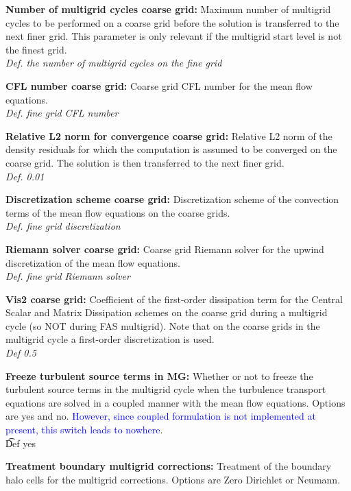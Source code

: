\documentclass[12pt,epsf,colordvi]{article}
\begin{document}
\begin{description}
% 
     	\item{\bf Number of multigrid cycles coarse grid:} Maximum number of multigrid cycles to be performed on a coarse grid before the solution is transferred to the next finer grid. This parameter is only relevant if the multigrid start level is not the finest grid. \\
{\it Def.  the number of multigrid cycles on the fine grid}
%
    \item{\bf CFL number coarse grid:} Coarse grid CFL number for the mean flow equations. \\
{\it Def.  fine grid CFL number}
%
    \item{\bf Relative L2 norm for convergence coarse grid:} Relative L2 norm of the density residuals for which the computation is assumed to be converged on the coarse grid. The solution is then transferred to the next finer grid. \\
{\it Def. 0.01 }
%
    \item{\bf Discretization scheme coarse grid:} Discretization scheme of the convection terms of the mean flow equations on the coarse grids. \\
{\it Def. fine grid discretization}
%
     \item{\bf Riemann solver coarse grid:} Coarse grid Riemann solver for the upwind discretization of the mean flow equations. \\
{\it Def. fine grid Riemann solver}
%
      \item{\bf Vis2 coarse grid:} Coefficient of the first-order dissipation term for the Central Scalar and Matrix Dissipation schemes on the coarse grid during a multigrid cycle (so NOT during FAS multigrid).  Note that on the coarse grids in the multigrid cycle a first-order discretization is used. \\
{\it Def 0.5}
%
      \item{\bf Freeze turbulent source terms in MG:} Whether or not to freeze the turbulent source terms in the multigrid cycle when the turbulence transport equations are solved in a coupled manner with the mean flow equations. Options are yes and no. \textcolor{blue}{However, since coupled formulation is not implemented at present, this switch leads to nowhere}. \\
{\t Def  yes }
%
      \item{\bf Treatment boundary multigrid corrections:} Treatment of the boundary halo cells for the multigrid corrections. Options are Zero Dirichlet or Neumann. \\

\end{description}
\end{document}

